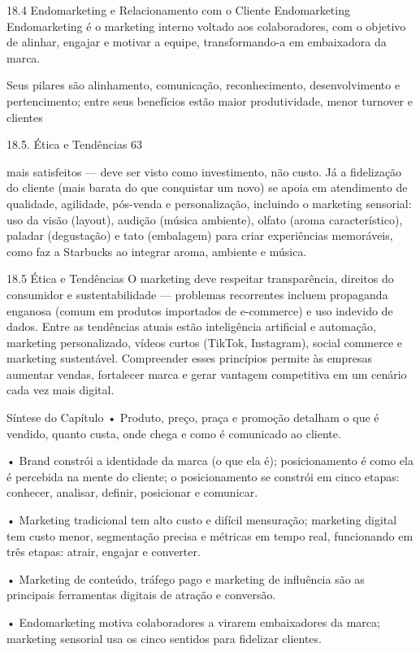 18.4 Endomarketing e Relacionamento com o Cliente Endomarketing Endomarketing é o marketing interno voltado aos colaboradores, com o objetivo de alinhar, engajar e motivar a equipe, transformando-a em embaixadora da marca.

Seus pilares são alinhamento, comunicação, reconhecimento, desenvolvimento e pertencimento; entre seus benefícios estão maior produtividade, menor turnover e clientes

18.5. Ética e Tendências 63

mais satisfeitos — deve ser visto como investimento, não custo. Já a fidelização do cliente (mais barata do que conquistar um novo) se apoia em atendimento de qualidade, agilidade, pós-venda e personalização, incluindo o marketing sensorial: uso da visão (layout), audição (música ambiente), olfato (aroma característico), paladar (degustação) e tato (embalagem) para criar experiências memoráveis, como faz a Starbucks ao integrar aroma, ambiente e música.

18.5 Ética e Tendências O marketing deve respeitar transparência, direitos do consumidor e sustentabilidade — problemas recorrentes incluem propaganda enganosa (comum em produtos importados de e-commerce) e uso indevido de dados. Entre as tendências atuais estão inteligência artificial e automação, marketing personalizado, vídeos curtos (TikTok, Instagram), social commerce e marketing sustentável. Compreender esses princípios permite às empresas aumentar vendas, fortalecer marca e gerar vantagem competitiva em um cenário cada vez mais digital.

Síntese do Capítulo • Produto, preço, praça e promoção detalham o que é vendido, quanto custa, onde chega e como é comunicado ao cliente.

• Brand constrói a identidade da marca (o que ela é); posicionamento é como ela é percebida na mente do cliente; o posicionamento se constrói em cinco etapas: conhecer, analisar, definir, posicionar e comunicar.

• Marketing tradicional tem alto custo e difícil mensuração; marketing digital tem custo menor, segmentação precisa e métricas em tempo real, funcionando em três etapas: atrair, engajar e converter.

• Marketing de conteúdo, tráfego pago e marketing de influência são as principais ferramentas digitais de atração e conversão.

• Endomarketing motiva colaboradores a virarem embaixadores da marca; marketing sensorial usa os cinco sentidos para fidelizar clientes.

